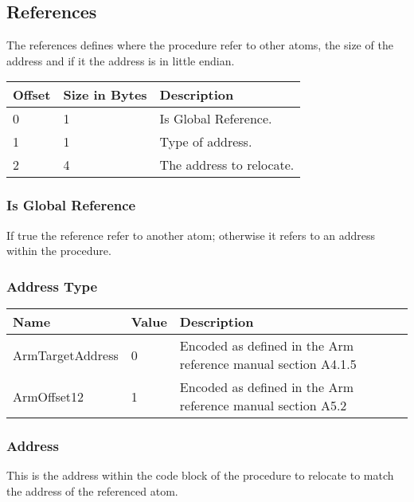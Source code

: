 \subsection{References}
The references defines where the procedure refer to other atoms, the size of the 
address and if it the address is in little endian.

\begin{table}[h]
    \centering
    \label{tbl:reference}
    \begin{tabular}{|l|l|l|}
        \hline
        \textbf{Offset} & \textbf{Size in Bytes} & \textbf{Description}     \\ \hline
        0               & 1                      & Is Global Reference.     \\ \hline
        1               & 1                      & Type of address.         \\ \hline
        2               & 4                      & The address to relocate. \\ \hline
    \end{tabular}
\end{table}

\subsubsection{Is Global Reference}
If true the reference refer to another atom; otherwise it refers to an address 
within the procedure.

\subsubsection{Address Type}
\begin{table}[h]
    \centering
    \begin{tabular}{|l|l|l|}
        \hline
        \textbf{Name}    & \textbf{Value} & \textbf{Description}                                          \\ \hline
        ArmTargetAddress & 0              & Encoded as defined in the Arm reference manual section A4.1.5 \\ \hline
        ArmOffset12      & 1              & Encoded as defined in the Arm reference manual section A5.2   \\ \hline
    \end{tabular}
\end{table}

\subsubsection{Address}
This is the address within the code block of the procedure to relocate to match
the address of the referenced atom.
\clearpage

